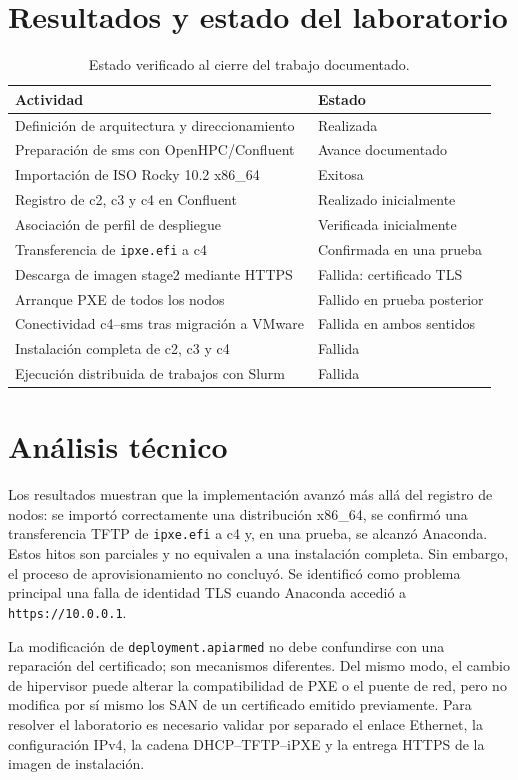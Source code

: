 \documentclass[12pt,a4paper]{article}
\begin{document}
\section{Resultados y estado del laboratorio}
\begin{table}[H]\centering\small\caption{Estado verificado al cierre del trabajo documentado.}
\begin{tabular}{p{8.1cm}p{4.0cm}}\toprule
Actividad & Estado \\\midrule
Definición de arquitectura y direccionamiento & Realizada \\
Preparación de sms con OpenHPC/Confluent & Avance documentado \\
Importación de ISO Rocky 10.2 x86\_64 & Exitosa \\
Registro de c2, c3 y c4 en Confluent & Realizado inicialmente \\
Asociación de perfil de despliegue & Verificada inicialmente \\
Transferencia de \texttt{ipxe.efi} a c4 & Confirmada en una prueba \\
Descarga de imagen stage2 mediante HTTPS & Fallida: certificado TLS \\
Arranque PXE de todos los nodos & Fallido en prueba posterior \\
Conectividad c4--sms tras migración a VMware & Fallida en ambos sentidos \\
Instalación completa de c2, c3 y c4 & Fallida \\
Ejecución distribuida de trabajos con Slurm & Fallida \\\bottomrule
\end{tabular}\end{table}

\section{Análisis técnico}
Los resultados muestran que la implementación avanzó más allá del registro de nodos: se importó correctamente una distribución x86\_64, se confirmó una transferencia TFTP de \texttt{ipxe.efi} a c4 y, en una prueba, se alcanzó Anaconda. Estos hitos son parciales y no equivalen a una instalación completa. Sin embargo, el proceso de aprovisionamiento no concluyó. Se identificó como problema principal una falla de identidad TLS cuando Anaconda accedió a \texttt{https://10.0.0.1}.

La modificación de \texttt{deployment.apiarmed} no debe confundirse con una reparación del certificado; son mecanismos diferentes. Del mismo modo, el cambio de hipervisor puede alterar la compatibilidad de PXE o el puente de red, pero no modifica por sí mismo los SAN de un certificado emitido previamente. Para resolver el laboratorio es necesario validar por separado el enlace Ethernet, la configuración IPv4, la cadena DHCP--TFTP--iPXE y la entrega HTTPS de la imagen de instalación.
\end{document}
